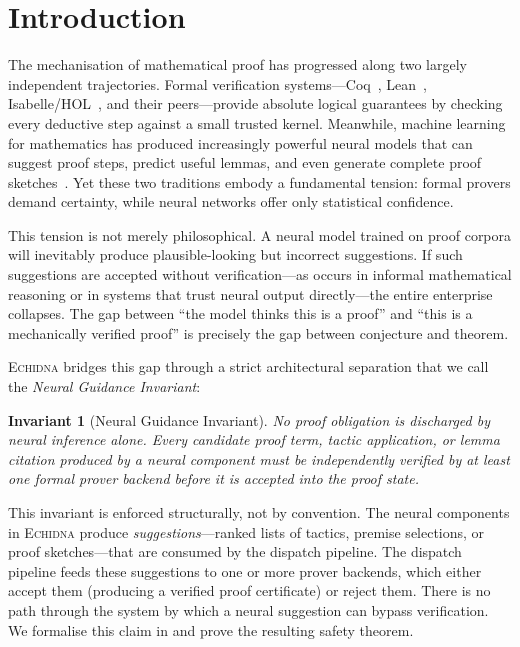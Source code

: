 \documentclass[11pt,a4paper]{article}
\newtheorem{invariant}[theorem]{Invariant}
\newcommand{\echidna}{\textsc{Echidna}}
\begin{document}

\section{Introduction}
\label{sec:introduction}

The mechanisation of mathematical proof has progressed along two largely
independent trajectories. Formal verification systems---Coq~\citep{coq},
Lean~\citep{lean4}, Isabelle/HOL~\citep{isabelle}, and their
peers---provide absolute logical guarantees by checking every deductive step
against a small trusted kernel. Meanwhile, machine learning for mathematics has
produced increasingly powerful neural models that can suggest proof steps,
predict useful lemmas, and even generate complete proof
sketches~\citep{alphaproof,leancopilot,baldur}. Yet these two traditions
embody a fundamental tension: formal provers demand certainty, while neural
networks offer only statistical confidence.

This tension is not merely philosophical. A neural model trained on proof
corpora will inevitably produce plausible-looking but incorrect suggestions.
If such suggestions are accepted without verification---as occurs in informal
mathematical reasoning or in systems that trust neural output
directly---the entire enterprise collapses. The gap between ``the model thinks
this is a proof'' and ``this is a mechanically verified proof'' is precisely the
gap between conjecture and theorem.

\echidna{} bridges this gap through a strict architectural separation that we
call the \emph{Neural Guidance Invariant}:

\begin{invariant}[Neural Guidance Invariant]
\label{inv:ngi}
No proof obligation is discharged by neural inference alone. Every
candidate proof term, tactic application, or lemma citation produced by
a neural component must be independently verified by at least one formal
prover backend before it is accepted into the proof state.
\end{invariant}

This invariant is enforced structurally, not by convention. The neural
components in \echidna{} produce \emph{suggestions}---ranked lists of tactics,
premise selections, or proof sketches---that are consumed by the dispatch
pipeline. The dispatch pipeline feeds these suggestions to one or more prover
backends, which either accept them (producing a verified proof certificate) or
reject them. There is no path through the system by which a neural suggestion
can bypass verification. We formalise this claim in  and
prove the resulting safety theorem.
\end{document}
